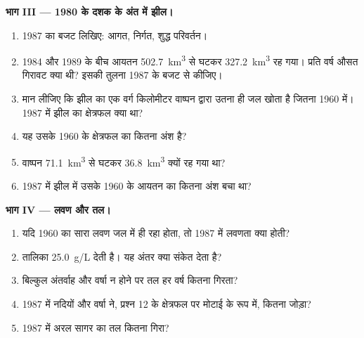\begin{problem}[{सप्ताहांत समस्या --- कोई झील कितनी तेज़ी से लुप्त होती है?}]
\medskip
\noindent\textbf{भाग III --- 1980 के दशक के अंत में झील।}
\begin{enumerate}[resume]
  \item 1987 का बजट लिखिए: आगत, निर्गत, शुद्ध परिवर्तन।
  \item 1984 और 1989 के बीच आयतन \qty{502.7}{km^3} से घटकर
        \qty{327.2}{km^3} रह गया। प्रति वर्ष औसत गिरावट क्या थी? इसकी तुलना
        1987 के बजट से कीजिए।
  \item मान लीजिए कि झील का एक वर्ग किलोमीटर वाष्पन द्वारा उतना ही जल खोता है
        जितना 1960 में। 1987 में झील का क्षेत्रफल क्या था?
  \item यह उसके 1960 के क्षेत्रफल का कितना अंश है?
  \item वाष्पन \qty{71.1}{km^3} से घटकर
        \qty{36.8}{km^3} क्यों रह गया था?
  \item 1987 में झील में उसके 1960 के आयतन का कितना अंश बचा था?
\end{enumerate}

\medskip
\noindent\textbf{भाग IV --- लवण और तल।}
\begin{enumerate}[resume]
  \item यदि 1960 का सारा लवण जल में ही रहा होता, तो 1987 में
        लवणता क्या होती?
  \item तालिका \qty{25.0}{g/L} देती है। यह अंतर क्या संकेत देता है?
  \item बिल्कुल अंतर्वाह और वर्षा न होने पर तल हर वर्ष कितना
        गिरता?
  \item 1987 में नदियों और वर्षा ने, प्रश्न 12 के क्षेत्रफल पर मोटाई के रूप में,
        कितना जोड़ा?
  \item 1987 में अरल सागर का तल कितना गिरा?
\end{enumerate}
\end{problem}
